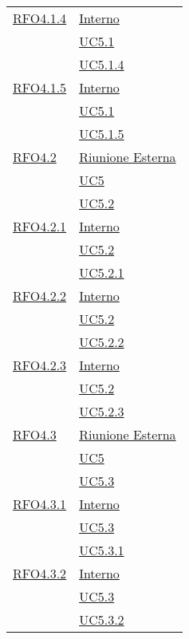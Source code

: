 \begin{longtable}{|>{\centering}m{5cm}|m{5cm}<{\centering}|}
\hyperlink{RFO4.1.4}{RFO4.1.4} & \hyperlink{Interno}{Interno}\\ &\hyperref[UC5.1]{UC5.1}\\ &\hyperref[UC5.1.4]{UC5.1.4}\\ \hline

\hyperlink{RFO4.1.5}{RFO4.1.5} &\hyperlink{Interno}{Interno}\\ &\hyperref[UC5.1]{UC5.1}\\ &\hyperref[UC5.1.4]{UC5.1.5}\\ \hline

\hyperlink{RFO4.2}{RFO4.2} & \hyperlink{Riunione Esterna}{Riunione Esterna}\\ &\hyperref[UC5]{UC5}\\ &\hyperref[UC5.2]{UC5.2}\\ \hline

\hyperlink{RFO4.2.1}{RFO4.2.1} & \hyperlink{Interno}{Interno}\\ &\hyperref[UC5.2]{UC5.2}\\ &\hyperref[UC5.2.1]{UC5.2.1}\\ \hline

\hyperlink{RFO4.2.2}{RFO4.2.2} &  \hyperlink{Interno}{Interno}\\ &\hyperref[UC5.2]{UC5.2}\\ &\hyperref[UC5.2.2]{UC5.2.2}\\ \hline

\hyperlink{RFO4.2.3}{RFO4.2.3} & \hyperlink{Interno}{Interno}\\ &\hyperref[UC5.2]{UC5.2}\\ &\hyperref[UC5.2.3]{UC5.2.3}\\ \hline

\hyperlink{RFO4.3}{RFO4.3} & \hyperlink{Riunione Esterna}{Riunione Esterna}\\ &\hyperref[UC5]{UC5}\\ &\hyperref[UC5.3]{UC5.3}\\ \hline

\hyperlink{RFO4.3.1}{RFO4.3.1} & \hyperlink{Interno}{Interno}\\ &\hyperref[UC5.3]{UC5.3}\\ &\hyperref[UC5.3.1]{UC5.3.1}\\ \hline

\hyperlink{RFO4.3.2}{RFO4.3.2} & \hyperlink{Interno}{Interno}\\ &\hyperref[UC5.3]{UC5.3}\\ &\hyperref[UC5.3.2]{UC5.3.2}\\ \hline


\end{longtable}
